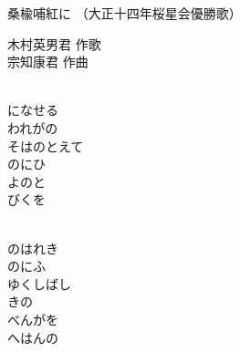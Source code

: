 \documentclass[10pt,b5j]{tarticle} %
\begin{document}
\begin{minipage}[c]{0.7\hsize} %
    \begin{center}
        {\LARGE
            桑楡哺紅に %
        }
        {\small 
            （大正十四年桜星会優勝歌） %
        }
    \end{center}
\end{minipage}
\begin{minipage}[c]{0.3\hsize} %
    \begin{flushright} %
        木村英男君 作歌\\宗知康君 作曲 %
    \end{flushright}
\end{minipage}

\vspace{1.5em} %
\newcommand{\linespace}{0.5em} %
\newcommand{\blocksize}{0.5\hsize} %
\newcommand{\itemmargin}{6em} %
\begin{enumerate} %
    \setlength{\itemindent}{\itemmargin} %
    \begin{minipage}[c]{\blocksize}
    
        \vspace{\linespace}
        \item~\\
        になせる\\
        われがの\\
        そはのとえて\\
        のにひ\\
        よのと\\
        びくを
        
        \vspace{\linespace}
        \item~\\
        のはれき\\
        のにふ\\
        ゆくしばし\\
        きの\\
        べんがを\\
        へはんの
    
    \end{minipage}
\end{enumerate} %
\end{document}
